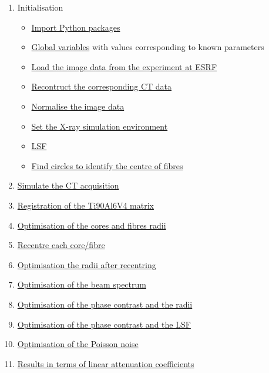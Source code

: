 \documentclass[11pt]{article}
\providecommand{\tightlist}{%
      \setlength{\itemsep}{0pt}\setlength{\parskip}{0pt}}
\begin{document}
\begin{enumerate}
\def\labelenumi{\arabic{enumi}.}
\tightlist
\item
  Initialisation

  \begin{itemize}
  \tightlist
  \item
    \hyperref[import-packages]{Import Python packages}
  \item
    \hyperref[global-variables]{Global variables} with values
    corresponding to known parameters
  \item
    \hyperref[load-the-image-data]{Load the image data from the experiment at ESRF}
  \item
    \hyperref[ct-reconstruction]{Recontruct the corresponding CT data}
  \item
    \hyperref[normalise-the-image-data]{Normalise the image data}
  \item
    \hyperref[set-the-x-ray-simulation-environment]{Set the X-ray simulation environment}
  \item
    \hyperref[the-lsf]{LSF}
  \item
    \hyperref[find-circles-to-identify-the-centre-of-fibres]{Find circles to identify the centre of fibres}
  \end{itemize}
\item
  \hyperref[simulate-the-ct-acquisition]{Simulate the CT acquisition}
\item
  \hyperref[registration-of-a-cube]{Registration of the Ti90Al6V4 matrix}
\item
  \hyperref[optimisation-of-the-cores-and-fibres-radii]{Optimisation of the cores and fibres radii}
\item
  \hyperref[recentre-each-corefibre]{Recentre each core/fibre}
\item
  \hyperref[optimisation-the-radii-after-recentring]{Optimisation the radii after recentring}
\item
  \hyperref[optimisation-of-the-beam-spectrum]{Optimisation of the beam spectrum}
\item
  \hyperref[optimisation-of-the-phase-contrast-and-the-radii]{Optimisation of the phase contrast and the radii}
\item
  \hyperref[optimisation-of-the-phase-contrast-and-the-lsf]{Optimisation of the phase contrast and the LSF}
\item
  \hyperref[optimisation-of-the-poisson-noise]{Optimisation of the Poisson noise}
\item
  \hyperref[results-in-terms-of-linear-attenuation-coefficients]{Results in terms of linear attenuation coefficients}
\end{enumerate}
\end{document}
